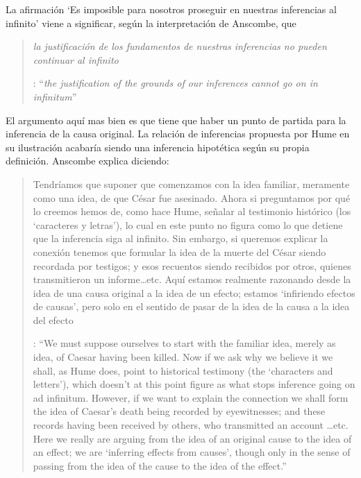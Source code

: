 La afirmación \enquote*{Es imposible para nosotros proseguir en nuestras inferencias al infinito} viene a significar, según la interpretación de Anscombe, que \blockquote[{\cite[Cf.~][87]{anscombe1981parmenides:humeandjulius}}: \enquote{\emph{the justification of the grounds of our inferences cannot go on in infinitum}}]{\emph{la justificación de los fundamentos de nuestras inferencias no pueden continuar al infinito}}. El argumento aquí mas bien es que tiene que haber un punto de partida para la inferencia de la causa original. La relación de inferencias propuesta por Hume en su ilustración acabaría siendo una inferencia hipotética según su propia definición. Anscombe explica diciendo: \blockquote[{\cite[117]{anscombe2011plato:humecaus}}: \enquote{We must suppose ourselves to start with the familiar idea, merely as idea, of Caesar having been killed. Now if we ask why we believe it we shall, as Hume does, point to historical testimony (the ‘characters and letters’), which doesn’t at this point figure as what stops inference going on ad infinitum. However, if we want to explain the connection we shall form the idea of Caesar’s death being recorded by eyewitnesses; and these records having been received by others, who transmitted an account \ldots etc. Here we really are arguing from the idea of an original cause to the idea of an effect; we are ‘inferring effects from causes’, though only in the sense of passing from the idea of the cause to the idea of the effect.}]{Tendríamos que suponer que comenzamos con la idea familiar, meramente como una idea, de que César fue asesinado. Ahora si preguntamos por qué lo creemos hemos de, como hace Hume, señalar al testimonio histórico (los `caracteres y letras'), lo cual en este punto no figura como lo que detiene que la inferencia siga al infinito. Sin embargo, si queremos explicar la conexión tenemos que formular la idea de la muerte del César siendo recordada por testigos; y esos recuentos siendo recibidos por otros, quienes transmitieron un informe\ldots etc. Aquí estamos realmente razonando desde la idea de una causa original a la idea de un efecto; estamos `infiriendo efectos de causas', pero solo en el sentido de pasar de la idea de la causa a la idea del efecto}.

